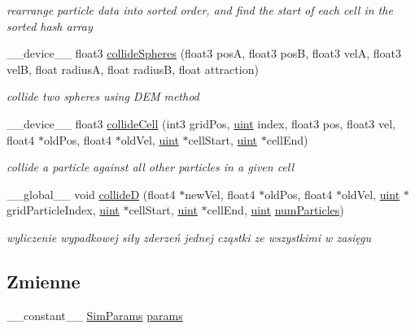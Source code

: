 \begin{DoxyCompactItemize}
\begin{DoxyCompactList}\small\item\em rearrange particle data into sorted order, and find the start of each cell in the sorted hash array \end{DoxyCompactList}\item 
\-\_\-\-\_\-device\-\_\-\-\_\- float3 \hyperlink{particles__kernel__impl_8cuh_a1d93cb067b16b4a472e9c1a08d9d8e68}{collide\-Spheres} (float3 pos\-A, float3 pos\-B, float3 vel\-A, float3 vel\-B, float radius\-A, float radius\-B, float attraction)
\begin{DoxyCompactList}\small\item\em collide two spheres using D\-E\-M method \end{DoxyCompactList}\item 
\-\_\-\-\_\-device\-\_\-\-\_\- float3 \hyperlink{particles__kernel__impl_8cuh_a8e623e11d4ac873cfbe9d7c916326363}{collide\-Cell} (int3 grid\-Pos, \hyperlink{particles__kernel_8cuh_a91ad9478d81a7aaf2593e8d9c3d06a14}{uint} index, float3 pos, float3 vel, float4 $\ast$old\-Pos, float4 $\ast$old\-Vel, \hyperlink{particles__kernel_8cuh_a91ad9478d81a7aaf2593e8d9c3d06a14}{uint} $\ast$cell\-Start, \hyperlink{particles__kernel_8cuh_a91ad9478d81a7aaf2593e8d9c3d06a14}{uint} $\ast$cell\-End)
\begin{DoxyCompactList}\small\item\em collide a particle against all other particles in a given cell \end{DoxyCompactList}\item 
\-\_\-\-\_\-global\-\_\-\-\_\- void \hyperlink{particles__kernel__impl_8cuh_a9056c5c0f33cbc0acb1c2b12e1a2a530}{collide\-D} (float4 $\ast$new\-Vel, float4 $\ast$old\-Pos, float4 $\ast$old\-Vel, \hyperlink{particles__kernel_8cuh_a91ad9478d81a7aaf2593e8d9c3d06a14}{uint} $\ast$grid\-Particle\-Index, \hyperlink{particles__kernel_8cuh_a91ad9478d81a7aaf2593e8d9c3d06a14}{uint} $\ast$cell\-Start, \hyperlink{particles__kernel_8cuh_a91ad9478d81a7aaf2593e8d9c3d06a14}{uint} $\ast$cell\-End, \hyperlink{particles__kernel_8cuh_a91ad9478d81a7aaf2593e8d9c3d06a14}{uint} \hyperlink{particles_8cpp_a05b8a90212054a3eb1a036ae0c269596}{num\-Particles})
\begin{DoxyCompactList}\small\item\em wyliczenie wypadkowej siły zderzeń jednej cząstki ze wszystkimi w zasięgu \end{DoxyCompactList}\end{DoxyCompactItemize}
\subsection*{Zmienne}
\begin{DoxyCompactItemize}
\item 
\-\_\-\-\_\-constant\-\_\-\-\_\- \hyperlink{struct_sim_params}{Sim\-Params} \hyperlink{particles__kernel__impl_8cuh_a8db8938e28edd17862daf58651051bdc}{params}
\end{DoxyCompactItemize}



